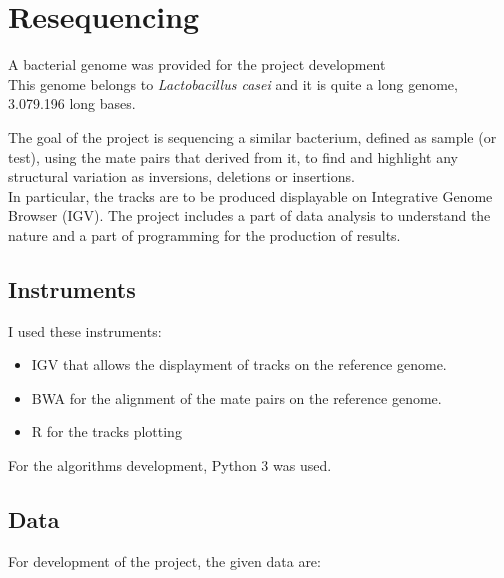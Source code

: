 
\chapter{Resequencing}
\label{cap:resequencing}

A bacterial genome was provided for the project development \\

This genome belongs to \emph{Lactobacillus casei} and it is quite a long genome, 3.079.196 long bases.

The goal of the project is sequencing a similar bacterium, defined as sample (or test), using the mate pairs that derived from it, to find and highlight any structural variation as inversions, deletions or insertions.\\
In particular, the tracks are to be produced displayable on Integrative Genome Browser (IGV).
The project includes a part of data analysis to understand the nature and a part of programming for the production of results.

\section{Instruments}

I used these instruments:
\begin{itemize}
\item IGV that allows the displayment of tracks on the reference genome.
\item BWA for the alignment of the mate pairs on the reference genome.
\item R for the tracks plotting
\end{itemize}

For the algorithms development, Python 3 was used.

\section{Data}

For development of the project, the given data are:\\
    

